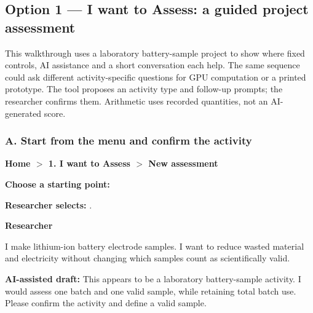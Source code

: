 \documentclass[11pt,a4paper]{article}
\begin{document}
\subsection{Option 1 --- I want to Assess: a guided project assessment}
\label{sec:assess-dialogue}
This walkthrough uses a laboratory battery-sample project to show where fixed controls, AI assistance and a short conversation each help. The same sequence could ask different activity-specific questions for GPU computation or a printed prototype. The tool proposes an activity type and follow-up prompts; the researcher confirms them. Arithmetic uses recorded quantities, not an AI-generated score.


\subsubsection*{A. Start from the menu and confirm the activity}
\begin{assessscreen}
\textbf{Home $>$ 1. I want to Assess $>$ New assessment}\par
\textbf{Choose a starting point:}\quad
{}\quad
{}\quad
{}\quad
{}\par\medskip
\textbf{Researcher selects:} .
\end{assessscreen}

\begin{flushright}\begin{assessuser}
\textbf{Researcher}\par
I make lithium-ion battery electrode samples. I want to reduce wasted material and electricity without changing which samples count as scientifically valid.
\end{assessuser}\end{flushright}

\begin{assessscreen}
\textbf{AI-assisted draft:} This appears to be a laboratory battery-sample activity. I would assess one batch and one valid sample, while retaining total batch use. Please confirm the activity and define a valid sample.\par\medskip
{}\quad
{}\quad
{}
\end{assessscreen}
\end{document}
